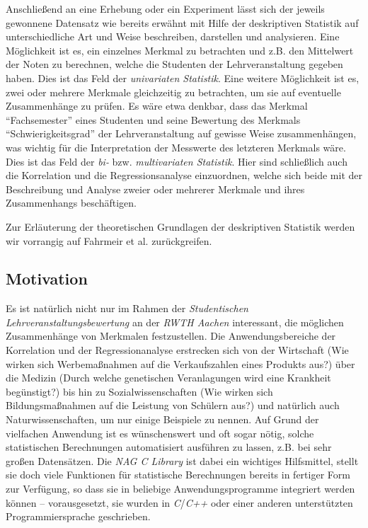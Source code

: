 Anschließend an eine Erhebung oder ein Experiment lässt sich  der jeweils gewonnene Datensatz wie bereits erwähnt mit Hilfe der deskriptiven Statistik auf unterschiedliche Art und Weise beschreiben, darstellen und analysieren. Eine Möglichkeit ist es, ein einzelnes Merkmal zu betrachten und z.B. den Mittelwert der Noten zu berechnen, welche die Studenten der Lehrveranstaltung gegeben haben. Dies ist das Feld der {\it univariaten Statistik}. Eine weitere Möglichkeit ist es, zwei oder mehrere Merkmale gleichzeitig zu betrachten, um sie auf eventuelle Zusammenhänge zu prüfen. Es wäre etwa denkbar, dass das Merkmal "`Fachsemester"' eines Studenten und seine Bewertung des Merkmals "`Schwierigkeitsgrad"' der Lehrveranstaltung auf gewisse Weise zusammenhängen, was wichtig für die Interpretation der Messwerte des letzteren Merkmals wäre. Dies ist das Feld der {\it bi-} bzw. {\it multivariaten Statistik}. Hier sind schließlich auch die Korrelation und die Regressionsanalyse einzuordnen, welche sich beide mit der Beschreibung und Analyse zweier oder mehrerer Merkmale und ihres Zusammenhangs beschäftigen.

Zur Erläuterung der theoretischen Grundlagen der deskriptiven Statistik werden wir vorrangig auf Fahrmeir et al. \cite{Fahrmeir2010} zurückgreifen.

\subsection{Motivation}

Es ist natürlich nicht nur im Rahmen der {\it Studentischen Lehrveranstaltungsbewertung} an der {\it RWTH Aachen} interessant, die möglichen Zusammenhänge von Merkmalen festzustellen. Die Anwendungsbereiche der Korrelation und der Regressionanalyse erstrecken sich von der Wirtschaft (Wie wirken sich Werbemaßnahmen auf die Verkaufszahlen eines Produkts aus?) über die Medizin (Durch welche genetischen Veranlagungen wird eine Krankheit begünstigt?) bis hin zu Sozialwissenschaften (Wie wirken sich Bildungsmaßnahmen auf die Leistung von Schülern aus?) und natürlich auch Naturwissenschaften, um nur einige Beispiele zu nennen. Auf Grund der vielfachen Anwendung ist es wünschenswert und oft sogar nötig, solche statistischen Berechnungen automatisiert ausführen zu lassen, z.B. bei sehr großen Datensätzen. Die {\it NAG C Library} ist dabei ein wichtiges Hilfsmittel, stellt sie doch viele Funktionen für statistische Berechnungen bereits in fertiger Form zur Verfügung, so dass sie in beliebige Anwendungsprogramme integriert werden können -- vorausgesetzt, sie wurden in {\it C}/{\it C++} oder einer anderen unterstützten Programmiersprache geschrieben.

